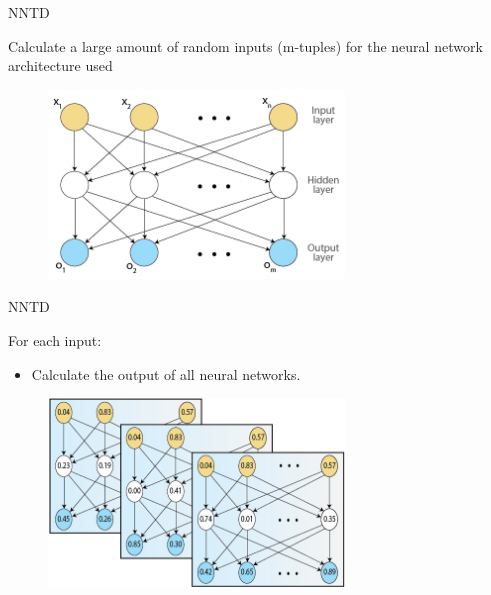 \begin{frame}{NNTD}
\begin{center}
Calculate a large amount of random inputs (m-tuples) for the neural network architecture used
 \begin{figure}[p]
  \includegraphics[width=0.7\textwidth]{images/neuralnetwork.png}
  \end{figure}
\end{center}
\end{frame}

\begin{frame}{NNTD}
\begin{center}
For each input:
  \begin{itemize}
      \item Calculate the output of all neural networks.
  \end{itemize}
   \begin{figure}[p]
  \includegraphics[width=0.7\textwidth]{images/neuralnetworkvalues.png}
  \end{figure}
\end{center}
\end{frame}

